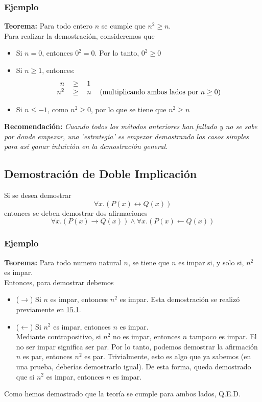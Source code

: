 \documentclass[../main.tex]{subfiles}
\begin{document}
\subsubsection*{Ejemplo}
\textbf{Teorema:} Para todo entero $n$ se cumple que $n^2 \geq n$.\\
Para realizar la demostración, consideremos que
\begin{itemize}
    \item Si $n = 0$, entonces $0^2 = 0$. Por lo tanto, $0^2 \geq 0$
    \item Si $n \geq 1$, entonces:
    \[
        \begin{tabular}{rcll}
            $n$ & $\geq$ & $1$\\
            $n^2$ & $\geq$ & $n$ & (multiplicando ambos lados por $n \geq 0$)\\
        \end{tabular}
    \]
    \item Si $n \leq -1$, como $n^2 \geq 0$, por lo que se tiene que $n^2 \geq n$
\end{itemize}

\textbf{Recomendación:} \textit{Cuando todos los métodos anteriores han fallado y no se sabe por donde empezar, una 'estrategia' es empezar demostrando los casos simples para así ganar intuición en la demostración general.}
    

\subsection{Demostración de Doble Implicación}
Si se desea demostrar
\[ \forall x . (P(x) \leftrightarrow Q(x)) \]
entonces se deben demostrar dos afirmaciones
\[ \forall x . (P(x) \rightarrow Q(x)) \wedge \forall x . (P(x) \leftarrow Q(x)) \]
\subsubsection*{Ejemplo}
\textbf{Teorema:} Para todo numero natural $n$, se tiene que $n$ es impar si, y solo si, $n^2$ es impar.\\
Entonces, para demostrar debemos
\begin{itemize}
    \item ($\rightarrow$) Si $n$ es impar, entonces $n^2$ es impar. Esta demostración se realizó previamente en \hyperref[sec:nimpar]{15.1}.
    \item ($\leftarrow$) Si $n^2$ es impar, entonces $n$ es impar.\\
    Mediante contrapositivo, si $n^2$ no es impar, entonces $n$ tampoco es impar. El no ser impar significa ser par. Por lo tanto, podemos demostrar la afirmación $n$ es par, entonces $n^2$ es par. Trivialmente, esto es algo que ya sabemos (en una prueba, deberías demostrarlo igual). De esta forma, queda demostrado que si $n^2$ es impar, entonces $n$ es impar.
\end{itemize}
Como hemos demostrado que la teoría se cumple para ambos lados, Q.E.D.
\end{document}

